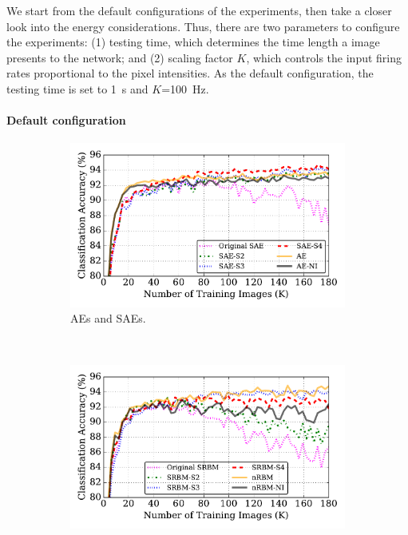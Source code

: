We start from the default configurations of the experiments, then take a closer look into the energy considerations.
Thus, there are two parameters to configure the experiments: (1) testing time, which determines the time length a image presents to the network; and (2) scaling factor $K$, which controls the input firing rates proportional to the pixel intensities.
As the default configuration, the testing time is set to 1~s and $K$=100~Hz.
 


\paragraph{Default configuration\\}

\begin{figure}
	\centering
	\begin{subfigure}[t]{0.8\textwidth}
		\includegraphics[width=\textwidth]{pics_sdlm/43_MNIST_SAE_all/compare_result.pdf}
		\caption{AEs and SAEs.}
	\end{subfigure}\\
	\begin{subfigure}[t]{0.8\textwidth}
		\includegraphics[width=\textwidth]{pics_sdlm/53_MNIST_SRBM_all/compare_result.pdf}

\end{subfigure}
\end{figure}
